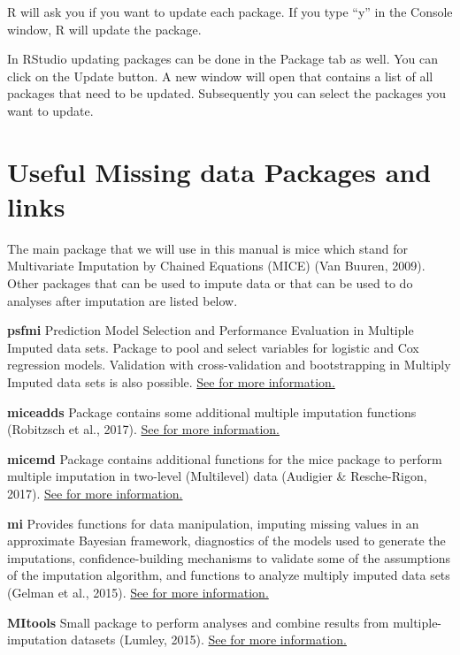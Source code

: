 \documentclass[
]{book}
\begin{document}
R will ask you if you want to update each package. If you type ``y'' in the Console window, R will update the package.

In RStudio updating packages can be done in the Package tab as well. You can click on the Update button. A new window will open that contains a list of all packages that need to be updated. Subsequently you can select the packages you want to update.

\hypertarget{useful-missing-data-packages-and-links}{%
\section{Useful Missing data Packages and links}\label{useful-missing-data-packages-and-links}}

The main package that we will use in this manual is mice which stand for Multivariate Imputation by Chained Equations (MICE) (Van Buuren, 2009). Other packages that can be used to impute data or that can be used to do analyses after imputation are listed below.

\textbf{psfmi}
Prediction Model Selection and Performance Evaluation in Multiple Imputed data sets. Package to pool and select variables for logistic and Cox regression models. Validation with cross-validation and bootstrapping in Multiply Imputed data sets is also possible.
\href{https://mwheymans.github.io/psfmi/}{See for more information.}

\textbf{miceadds}
Package contains some additional multiple imputation functions (Robitzsch et al., 2017).
\href{https://cran.r-project.org/web/packages/miceadds/index.html}{See for more information.}

\textbf{micemd}
Package contains additional functions for the mice package to perform multiple imputation in two-level (Multilevel) data (Audigier \& Resche-Rigon, 2017).
\href{https://cran.r-project.org/web/packages/micemd/index.html}{See for more information.}

\textbf{mi}
Provides functions for data manipulation, imputing missing values in an approximate Bayesian framework, diagnostics of the models used to generate the imputations, confidence-building mechanisms to validate some of the assumptions of the imputation algorithm, and functions to analyze multiply imputed data sets (Gelman et al., 2015).
\href{https://cran.r-project.org/web/packages/mi/index.html}{See for more information.}

\textbf{MItools}
Small package to perform analyses and combine results from multiple-imputation datasets (Lumley, 2015).
\href{https://cran.r-project.org/web/packages/mitools/index.html}{See for more information.}
\end{document}
